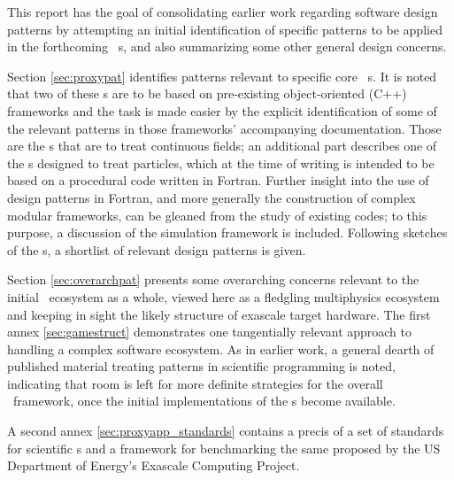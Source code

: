 This report has the goal of consolidating earlier work regarding software
design patterns \cite{y2re332} by attempting an initial identification of
specific patterns to be applied in the forthcoming \nep\ \papp s, and also
summarizing some other general design concerns.

Section \ref{sec:proxypat} identifies patterns relevant to
specific core \nep\ \papp s.
It is noted that two of these \papp s are to be based on pre-existing
object-oriented (C++) frameworks and the task is made easier by the explicit
identification of some of the relevant patterns in those frameworks'
accompanying documentation.
Those are the \papp s that are to treat continuous fields; an additional part
describes one of the \papp s designed to treat particles, which at the time 
of writing is intended to be based on a procedural code written in Fortran.  
Further insight into the use of design patterns in Fortran, and more generally the
construction of complex modular frameworks, can be 
gleaned from the study of existing codes; to this purpose, a discussion of 
the  simulation framework is included.
Following sketches of the \papp s, a shortlist of relevant design patterns is
given.

Section \ref{sec:overarchpat} presents some overarching concerns
relevant to the initial \papp\ ecosystem as a whole, viewed here as a
fledgling multiphysics ecosystem and keeping in sight the likely structure of
exascale target hardware.
The first annex \ref{sec:gamestruct} demonstrates one tangentially relevant approach
to handling a complex software ecosystem.
As in earlier work, a general dearth of published material treating patterns in
scientific programming is noted, indicating that room is left for more definite
strategies for the overall \nep \ framework, once the initial implementations
of the \papp s become available.

A second  annex \ref{sec:proxyapp_standards} contains a precis of a set of standards
for scientific \papp s and a framework for benchmarking the same proposed by
the US Department of Energy's Exascale Computing Project.
